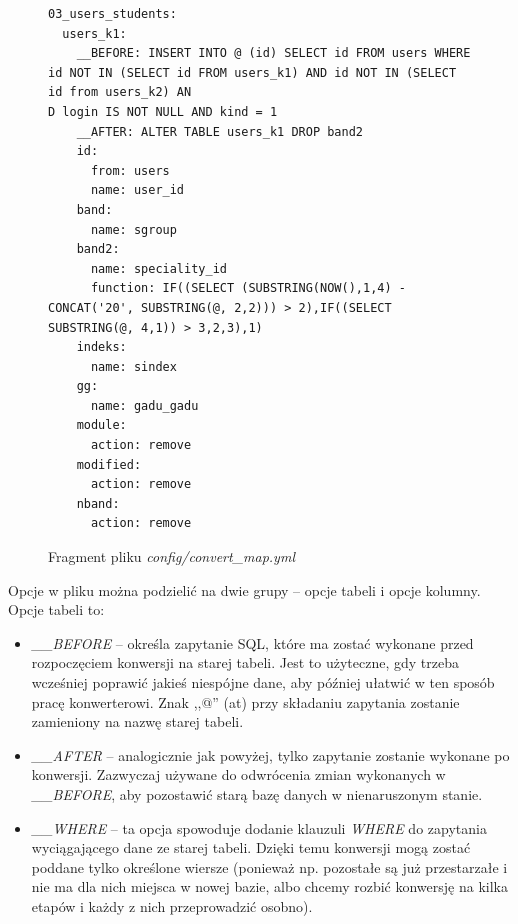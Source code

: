 \documentclass[a4paper,12pt,oneside]{report}
\begin{document}
\begin{figure}[h]
\centering
\begin{verbatim}03_users_students:
  users_k1:
    __BEFORE: INSERT INTO @ (id) SELECT id FROM users WHERE id NOT IN (SELECT id FROM users_k1) AND id NOT IN (SELECT id from users_k2) AN
D login IS NOT NULL AND kind = 1
    __AFTER: ALTER TABLE users_k1 DROP band2
    id:
      from: users
      name: user_id
    band:
      name: sgroup
    band2:
      name: speciality_id
      function: IF((SELECT (SUBSTRING(NOW(),1,4) - CONCAT('20', SUBSTRING(@, 2,2))) > 2),IF((SELECT SUBSTRING(@, 4,1)) > 3,2,3),1)
    indeks:
      name: sindex
    gg:
      name: gadu_gadu
    module:
      action: remove
    modified:
      action: remove
    nband:
      action: remove\end{verbatim}
\caption{Fragment pliku \emph{config/convert\_map.yml}\label{fig:convert_map-ex}}
\end{figure}

Opcje w pliku można podzielić na dwie grupy -- opcje tabeli i opcje kolumny. Opcje tabeli to:
\begin{itemize}
  \item \emph{\_\_BEFORE} -- określa zapytanie SQL, które ma zostać wykonane przed rozpoczęciem konwersji na starej tabeli. Jest to użyteczne, gdy trzeba wcześniej poprawić jakieś niespójne dane, aby później ułatwić w ten sposób pracę konwerterowi. Znak ,,@'' (at) przy składaniu zapytania zostanie zamieniony na nazwę starej tabeli.
  \item \emph{\_\_AFTER} -- analogicznie jak powyżej, tylko zapytanie zostanie wykonane po konwersji. Zazwyczaj używane do odwrócenia zmian wykonanych w \emph{\_\_BEFORE}, aby pozostawić starą bazę danych w nienaruszonym stanie.
  \item \emph{\_\_WHERE} -- ta opcja spowoduje dodanie klauzuli \emph{WHERE} do zapytania wyciągającego dane ze starej tabeli. Dzięki temu konwersji mogą zostać poddane tylko określone wiersze (ponieważ np. pozostałe są już przestarzałe i nie ma dla nich miejsca w nowej bazie, albo chcemy rozbić konwersję na kilka etapów i każdy z nich przeprowadzić osobno).
\end{itemize}
\end{document}
